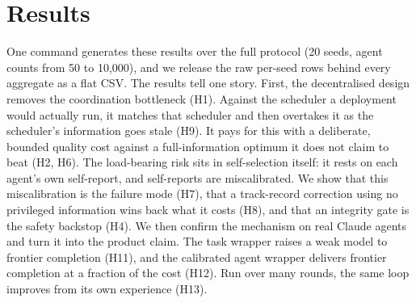 \documentclass[11pt]{article}
\begin{document}
\section{Results}\label{sec:results}

One command generates these results over the full protocol (20 seeds, agent counts from 50 to 10{,}000), and we release the raw per-seed rows behind every aggregate as a flat CSV. The results tell one story. First, the decentralised design removes the coordination bottleneck (H1). Against the scheduler a deployment would actually run, it matches that scheduler and then overtakes it as the scheduler's information goes stale (H9). It pays for this with a deliberate, bounded quality cost against a full-information optimum it does not claim to beat (H2, H6). The load-bearing risk sits in self-selection itself: it rests on each agent's own self-report, and self-reports are miscalibrated. We show that this miscalibration is the failure mode (H7), that a track-record correction using no privileged information wins back what it costs (H8), and that an integrity gate is the safety backstop (H4). We then confirm the mechanism on real Claude agents and turn it into the product claim. The task wrapper raises a weak model to frontier completion (H11), and the calibrated agent wrapper delivers frontier completion at a fraction of the cost (H12). Run over many rounds, the same loop improves from its own experience (H13).
\end{document}

